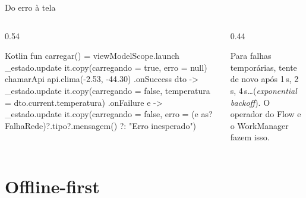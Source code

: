 \documentclass[aspectratio=169,10pt]{beamer}
\begin{document}
\begin{frame}[fragile]{Do erro à tela}
  \begin{columns}[T]
    \begin{column}{0.54\textwidth}
\begin{codigo}[title=ClimaViewModel.kt]{Kotlin}
fun carregar() = viewModelScope.launch {
  _estado.update { it.copy(carregando = true, erro = null) }
  chamarApi { api.clima(-2.53, -44.30) }
    .onSuccess { dto ->
      _estado.update {
        it.copy(carregando = false,
          temperatura = dto.current.temperatura)
      }
    }
    .onFailure { e ->
      _estado.update {
        it.copy(carregando = false,
          erro = (e as? FalhaRede)?.tipo?.mensagem()
            ?: "Erro inesperado")
      }
    }
}
\end{codigo}
    \end{column}
    \begin{column}{0.44\textwidth}
      \centering
      \begin{dica}
        Para falhas temporárias, tente de novo após 1\,s, 2\,s, 4\,s\ldots (\emph{exponential backoff}). O operador  do Flow e o WorkManager fazem isso.
      \end{dica}
    \end{column}
  \end{columns}
\end{frame}

\section{Offline-first}
\end{document}
